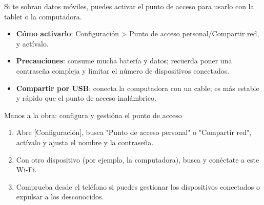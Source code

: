 
Si te sobran datos móviles, puedes activar el punto de acceso para usarlo con la tablet o la computadora.

\begin{itemize}
  \item \textbf{Cómo activarlo}: Configuración > Punto de acceso personal/Compartir red, y actívalo.
  \item \textbf{Precauciones}: consume mucha batería y datos; recuerda poner una contraseña compleja y limitar el número de dispositivos conectados.
  \item \textbf{Compartir por USB}: conecta la computadora con un cable; es más estable y rápido que el punto de acceso inalámbrico.
\end{itemize}

\begin{tcbpractice}{Manos a la obra: configura y gestióna el punto de acceso}
\begin{enumerate}
  \item Abre [Configuración], busca "Punto de acceso personal" o "Compartir red", actívalo y ajusta el nombre y la contraseña.
  \item Con otro dispositivo (por ejemplo, la computadora), busca y conéctate a este Wi-Fi.
  \item Comprueba desde el teléfono si puedes gestionar los dispositivos conectados o expulsar a los desconocidos.
\end{enumerate}

\end{tcbpractice}
